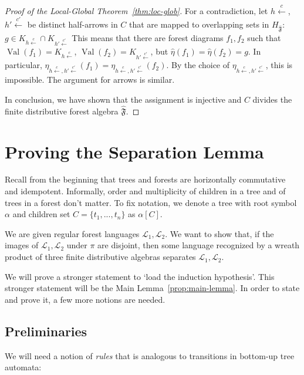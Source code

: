 \documentclass[sigplan,9pt]{acmart}\settopmatter{printfolios=true,printccs=false,printacmref=false}
\newcounter{thm}
\theoremstyle{definition}
\newcommand{\La}[0]{{\mathcal{L}}}
\newcommand{\Ff}[0]{{\mathfrak{F}}}
\newcommand{\carrow}[3]{#3 \xleftarrow{#2} #1 }
\begin{document}
\begin{proof}[Proof of the Local-Global Theorem~\ref{thm:loc-glob}]
For a contradiction, let $\carrow{}{c}h$, $\carrow{}{c'}{h'}$ be distinct half-arrows in $C$ that are mapped to overlapping sets in $H_{\widehat{\Ff}}$:
$g \in K_{\carrow{}{c}h} \cap K_{\carrow{}{c'}{h'}}$
This means that there are forest diagrams $f_1, f_2$ such that
$\operatorname{Val}(f_1) = K_{\carrow{}{c}h}$, $\operatorname{Val}(f_2) = K_{\carrow{}{c'}{h'}}$, but $\widehat{\eta}(f_1) = \widehat{\eta}(f_2) = g$.
In particular, $\eta_{\carrow{}{c}h, \carrow{}{c'}{h'}}(f_1) = \eta_{\carrow{}{c}h, \carrow{}{c'}{h'}}(f_2)$.
By the choice of $\eta_{\carrow{}{c}h, \carrow{}{c'}{h'}}$, this is impossible.
The argument for arrows is similar.

In conclusion, we have shown that the assignment is injective and $C$ divides the finite distributive forest algebra $\widehat{\Ff}$.


\end{proof}


\newpage
\section{Proving the Separation Lemma}\label{sec:sep}

Recall from the beginning that trees and forests are horizontally commutative and idempotent.
Informally, order and multiplicity of children in a tree and of trees in a forest don't matter.
To fix notation, we denote a tree with root symbol $\alpha$ and children set $C = \{t_1, ..., t_n\}$ as $\alpha[C]$.


We are given regular forest languages $\La_1, \La_2$. We want to show that, if the images of $\La_1, \La_2$ under $\pi$ are disjoint, then some language recognized by a wreath product of three finite distributive algebras separates $\La_1, \La_2$.

We will prove a stronger statement to `load the induction hypothesis'.
This stronger statement will be the Main Lemma~\ref{prop:main-lemma}.
In order to state and prove it, a few more notions are needed.

\subsection{Preliminaries}

We will need a notion of \emph{rules} that is analogous to transitions in bottom-up tree automata:
\end{document}
